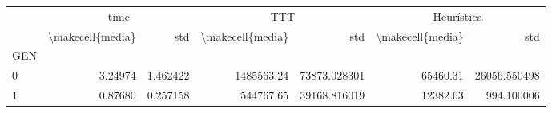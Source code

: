 \begin{tabular}{lrrrrrr}
\toprule
{} & \multicolumn{2}{c}{time} & \multicolumn{2}{c}{TTT} & \multicolumn{2}{c}{Heurística} \\
{} & \textbackslash makecell\{media\} &       std & \textbackslash makecell\{media\} &           std & \textbackslash makecell\{media\} &           std \\
GEN &                  &           &                  &               &                  &               \\
\midrule
0   &          3.24974 &  1.462422 &       1485563.24 &  73873.028301 &         65460.31 &  26056.550498 \\
1   &          0.87680 &  0.257158 &        544767.65 &  39168.816019 &         12382.63 &    994.100006 \\
\bottomrule
\end{tabular}

